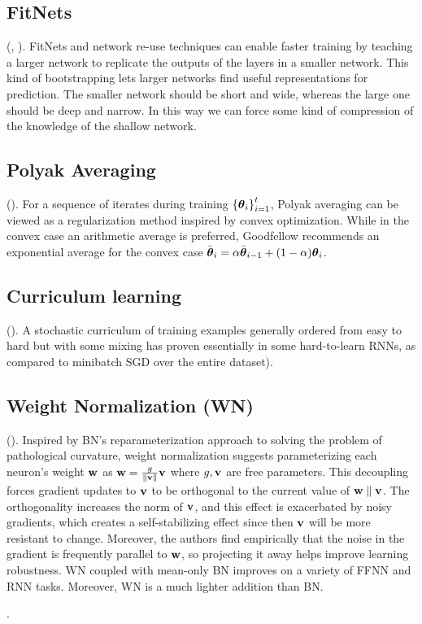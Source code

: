 \documentclass{article}
\begin{document}
\subsection{FitNets}

(, ). FitNets and network re-use techniques can enable faster training by teaching a larger network to replicate the outputs of the layers in a smaller network. This kind of bootstrapping lets larger networks find useful representations for prediction. The smaller network should be short and wide, whereas the large one should be deep and narrow. In this way we can force some kind of compression of the knowledge of the shallow network.

\subsection{Polyak Averaging}

(). For a sequence of iterates during training $\left\{{{\boldsymbol\theta}_i}\right\}_{i=1}^t$, Polyak averaging can be viewed as a regularization method inspired by convex optimization. While in the convex case an arithmetic average is preferred, Goodfellow recommends an exponential average for the convex case $\bar{{\boldsymbol\theta}}_i=\alpha \bar{{\boldsymbol\theta}}_{i-1}+(1-\alpha){\boldsymbol\theta}_{i}$.

\subsection{Curriculum learning}

(). A stochastic curriculum of training examples generally ordered from easy to hard but with some mixing has proven essentially in some hard-to-learn RNNs, as compared to minibatch SGD over the entire dataset).
\subsection{Weight Normalization (WN)}

(). Inspired by BN's reparameterization approach to solving the problem of pathological curvature, weight normalization suggests parameterizing each neuron's weight $\textbf{w}$ as $\textbf{w}=\frac{g}{\left\| \textbf{v} \right\|}\textbf{v}$ where $g,\textbf{v}$ are free parameters. This decoupling forces gradient updates to $\textbf{v}$ to be orthogonal to the current value of $\textbf{w}\parallel\textbf{v}$. The orthogonality increases the norm of $\textbf{v}$, and this effect is exacerbated by noisy gradients, which creates a self-stabilizing effect since then $\textbf{v}$ will be more resistant to change. Moreover, the authors find empirically that the noise in the gradient is frequently parallel to $\textbf{w}$, so projecting it away helps improve learning robustness. WN coupled with mean-only BN improves on a variety of FFNN and RNN tasks. Moreover, WN is a much lighter addition than BN.

.
\end{document}
